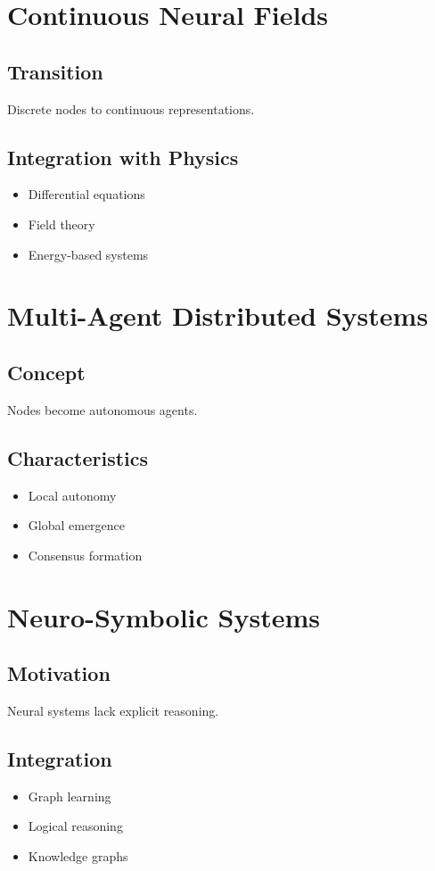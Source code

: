 \section{Continuous Neural Fields}

\subsection{Transition}
Discrete nodes to continuous representations.

\subsection{Integration with Physics}
\begin{itemize}
\item Differential equations
\item Field theory
\item Energy-based systems
\end{itemize}

\section{Multi-Agent Distributed Systems}

\subsection{Concept}
Nodes become autonomous agents.

\subsection{Characteristics}
\begin{itemize}
\item Local autonomy
\item Global emergence
\item Consensus formation
\end{itemize}

\section{Neuro-Symbolic Systems}

\subsection{Motivation}
Neural systems lack explicit reasoning.

\subsection{Integration}
\begin{itemize}
\item Graph learning
\item Logical reasoning
\item Knowledge graphs
\end{itemize}

